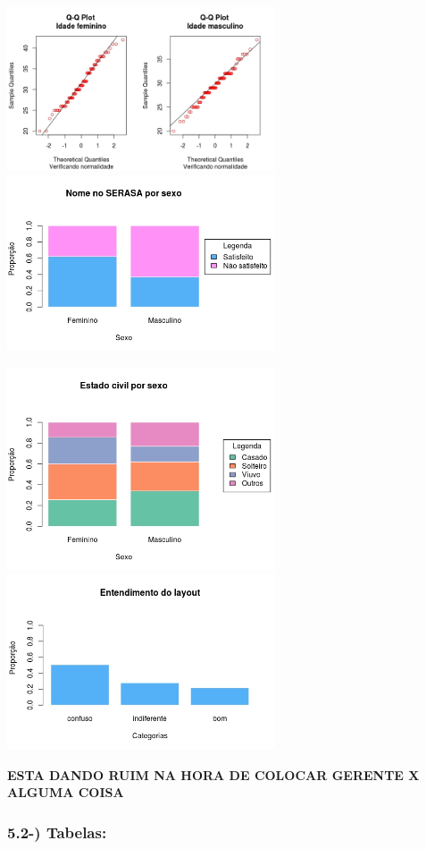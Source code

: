 \documentclass[]{article}
\begin{document}
\includegraphics[width=3.12500in]{QQ Plot idade genero.jpeg}
\includegraphics[width=3.12500in]{Nome no SERASA por sexo.jpeg}

\includegraphics[width=3.12500in]{Estado civil por Sexo.jpeg}
\includegraphics[width=3.12500in]{Entedimento do Layout.jpeg}

\textbf{ESTA DANDO RUIM NA HORA DE COLOCAR GERENTE X ALGUMA COISA}

\subsubsection{5.2-) Tabelas:}\label{tabelas}
\end{document}

